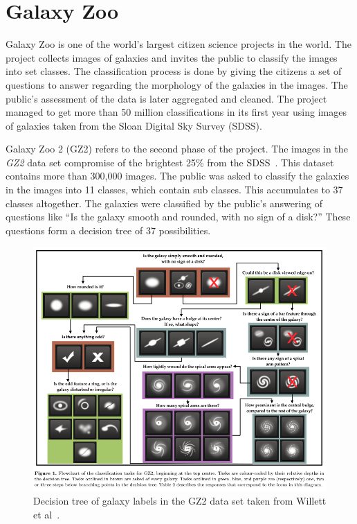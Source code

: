 \documentclass[12pt,a4paper,oneside,oldfontcommands]{memoir}
\begin{document}
\section{Galaxy Zoo}
Galaxy Zoo is one of the world’s largest citizen science projects in the world. The project collects images of galaxies and invites the public to classify the images into set classes. The classification process is done by giving the citizens a set of questions to answer regarding the morphology of the galaxies in the images.  The public's assessment of the data is later aggregated and cleaned. The project managed to get more than 50 million classifications in its first year using images of galaxies taken from the Sloan Digital Sky Survey (SDSS). 

Galaxy Zoo 2 (GZ2) refers to the second phase of the project. The images in the \textit{GZ2} data set compromise of the brightest 25\% from the SDSS~\cite{Willett}. This dataset contains more than 300,000 images. The public was asked to classify the galaxies in the images into 11 classes, which contain sub classes. This accumulates to 37 classes altogether. The galaxies were classified by the public’s answering of questions like “Is the galaxy smooth and rounded, with no sign of a disk?” These questions form a decision tree of 37 possibilities. 

    \begin{figure}[ht]
    \center
      \includegraphics[width=\linewidth]{images/gz-2-decision-tree.png}
      \caption{Decision tree of galaxy labels in the GZ2 data set taken from Willett et al~\cite{Willett}.}
      \label{fig:GZ2-Decision-Tree}
    \end{figure}
\end{document}
